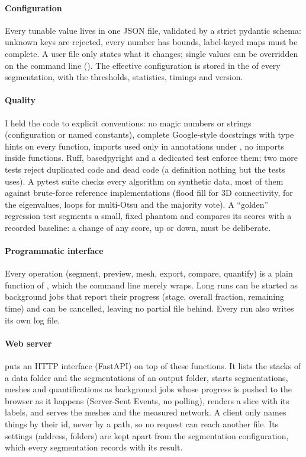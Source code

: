 \paragraph{Configuration} Every tunable value lives in one JSON file, validated by a strict pydantic
schema: unknown keys are rejected, every number has bounds, label-keyed maps must be complete. A user
file only states what it changes; single values can be overridden on the command line
(). The effective configuration is stored in the
 of every segmentation, with the thresholds, statistics, timings and version.

\paragraph{Quality} I held the code to explicit conventions: no magic numbers or strings (configuration
or named constants), complete Google-style docstrings with type hints on every function, imports used
only in annotations under , no imports inside functions. Ruff, basedpyright and
a dedicated test enforce them; two more tests reject duplicated code and dead code (a definition
nothing but the tests uses). A pytest suite checks every algorithm on synthetic data, most of them
against brute-force reference implementations (flood fill for 3D connectivity,  for
the eigenvalues, loops for multi-Otsu and the majority vote). A ``golden'' regression test segments a
small, fixed phantom and compares its scores with a recorded baseline: a change of any score, up or
down, must be deliberate.

\paragraph{Programmatic interface} Every operation (segment, preview, mesh, export, compare, quantify) is a plain
function of , which the command line merely wraps. Long runs can be started as
background jobs that report their progress (stage, overall fraction, remaining time) and can be
cancelled, leaving no partial file behind. Every run also writes its own log file.

\paragraph{Web server}  puts an HTTP interface (FastAPI) on top of these functions.
It lists the stacks of a data folder and the segmentations of an output folder, starts segmentations,
meshes and quantifications as background jobs whose progress is pushed to the browser as it happens
(Server-Sent Events, no polling), renders a slice with its labels, and serves the meshes and the
measured network. A client only names things
by their id, never by a path, so no request can reach another file. Its settings (address, folders)
are kept apart from the segmentation configuration, which every segmentation records with its result.

